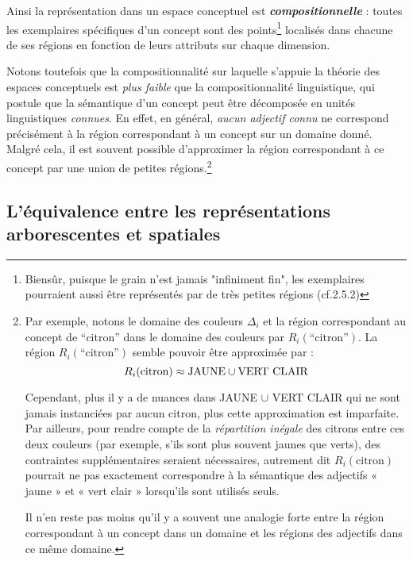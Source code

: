 \documentclass{article}
\newcommand{\bolditalic}[1]{\textbf{\textit{#1}}}
\begin{document}
Ainsi la représentation dans un espace conceptuel est \bolditalic{compositionnelle} : toutes les exemplaires spécifiques d'un concept sont des points\footnote{Biensûr, puisque le grain n'est jamais "infiniment fin", les exemplaires pourraient aussi être représentés par de très petites régions (cf.2.5.2)}  localisés dans chacune de ses régions en fonction de leurs attributs sur chaque dimension.
\par
Notons toutefois que la compositionnalité sur laquelle s’appuie la théorie des espaces conceptuels est \textit{plus faible} que la compositionnalité linguistique, qui postule que la sémantique d’un concept peut être décomposée en unités linguistiques \textit{connues}. En effet, en général, \textit{aucun adjectif connu} ne correspond précisément à la région correspondant à un concept sur un domaine donné. Malgré cela, il est souvent possible d’approximer la région correspondant à ce concept par une union de petites régions.\footnote{Par exemple, notons le domaine des couleurs $\Delta_i$ et la région correspondant au concept de ``citron'' dans le domaine des couleurs par $R_i(\text{``citron''})$. La région $R_i(\text{``citron''})$ semble pouvoir être approximée par :
\[R_i(\text{citron}) \approx \text{JAUNE} \cup \text{\mbox{VERT CLAIR}}\]

Cependant, plus il y a de nuances dans JAUNE $\cup$ VERT CLAIR qui ne sont jamais instanciées par aucun citron, plus cette approximation est imparfaite. Par ailleurs, pour rendre compte de la \textit{répartition inégale} des citrons entre ces deux couleurs (par exemple, s’ils sont plus souvent jaunes que verts), des contraintes supplémentaires seraient nécessaires, autrement dit $R_i(\text{citron})$ pourrait ne pas exactement
correspondre à la sémantique des adjectifs « jaune » et « vert clair » lorsqu’ils sont utilisés seuls.\par
Il n’en reste pas moins qu’il y a souvent une analogie forte entre la région correspondant à un concept dans un domaine et les régions des adjectifs dans ce même domaine.}

\subsection*{L’équivalence entre les représentations arborescentes et spatiales}

\doublespacing  %
\end{document}
